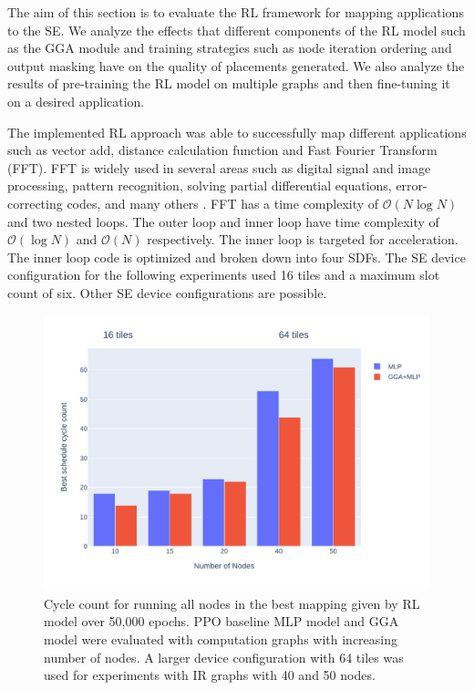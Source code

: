 
The aim of this section is to evaluate the RL framework for mapping applications to the SE.
We analyze the effects that different components of the RL model such as the GGA module and training strategies such as node iteration ordering and output masking have on the quality of placements generated. We also analyze the results of pre-training the RL model on multiple graphs and then fine-tuning it on a desired application.

The implemented RL approach was able to successfully map different applications such as vector add, distance calculation function and Fast Fourier Transform (FFT).
FFT is widely used in several areas such as digital signal and image processing, pattern recognition, solving partial differential equations, error-correcting codes, and many others \cite{814659}.
FFT has a time complexity of $\mathcal{O}(N\log{N})$ and two nested loops.
The outer loop and inner loop have time complexity of $\mathcal{O}(\log{N})$ and $\mathcal{O}(N)$ respectively.
The inner loop is targeted for acceleration.
The inner loop code is optimized and broken down into four SDFs.
The SE device configuration for the following experiments used 16 tiles and a maximum slot count of six.
Other SE device configurations are possible.


\begin{figure}[tbh]
  \centering
  \includegraphics[width=0.7\linewidth]{fig/nodes_graph.pdf}
  \caption{Cycle count for running all nodes in the best mapping given by RL model over 50,000 epochs.
    PPO baseline MLP model and GGA model were evaluated with computation graphs with increasing number of nodes.
    A larger device configuration with 64 tiles was used for experiments with IR graphs with 40 and 50 nodes. }
  \label{fig:nodes_graph}
\end{figure}

